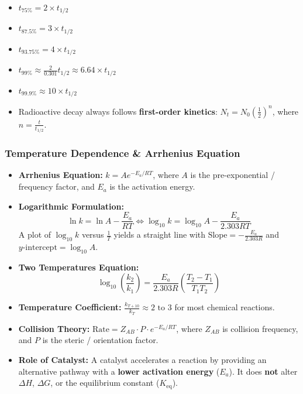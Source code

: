 \documentclass[11pt,a4paper]{article}
\begin{document}
\begin{examtip}
\begin{itemize}[leftmargin=1.2em, itemsep=2pt]
  \item $t_{75\%} = 2 \times t_{1/2}$
  \item $t_{87.5\%} = 3 \times t_{1/2}$
  \item $t_{93.75\%} = 4 \times t_{1/2}$
  \item $t_{99\%} \approx \frac{2}{0.301} t_{1/2} \approx 6.64 \times t_{1/2}$
  \item $t_{99.9\%} \approx 10 \times t_{1/2}$
  \item Radioactive decay always follows \textbf{first-order kinetics}: $N_t = N_0 \left(\frac{1}{2}\right)^n$, where $n = \frac{t}{t_{1/2}}$.
\end{itemize}
\end{examtip}

\subsubsection{Temperature Dependence \& Arrhenius Equation}
\begin{itemize}[leftmargin=1.5em, itemsep=2pt]
  \item \textbf{Arrhenius Equation:} $k = A e^{-E_a / RT}$, where $A$ is the pre-exponential / frequency factor, and $E_a$ is the activation energy.
  \item \textbf{Logarithmic Formulation:}
  \[
    \ln k = \ln A - \frac{E_a}{RT} \iff \log_{10} k = \log_{10} A - \frac{E_a}{2.303 RT}
  \]
  A plot of $\log_{10} k$ versus $\frac{1}{T}$ yields a straight line with $\text{Slope} = -\frac{E_a}{2.303 R}$ and $y\text{-intercept} = \log_{10} A$.
  \item \textbf{Two Temperatures Equation:}
  \[
    \log_{10} \left(\frac{k_2}{k_1}\right) = \frac{E_a}{2.303 R} \left(\frac{T_2 - T_1}{T_1 T_2}\right)
  \]
  \item \textbf{Temperature Coefficient:} $\frac{k_{T+10}}{k_T} \approx 2 \text{ to } 3$ for most chemical reactions.
  \item \textbf{Collision Theory:} $\text{Rate} = Z_{AB} \cdot P \cdot e^{-E_a / RT}$, where $Z_{AB}$ is collision frequency, and $P$ is the steric / orientation factor.
  \item \textbf{Role of Catalyst:} A catalyst accelerates a reaction by providing an alternative pathway with a \textbf{lower activation energy} ($E_a$). It does \textbf{not} alter $\Delta H$, $\Delta G$, or the equilibrium constant ($K_{\text{eq}}$).
\end{itemize}
\end{document}
